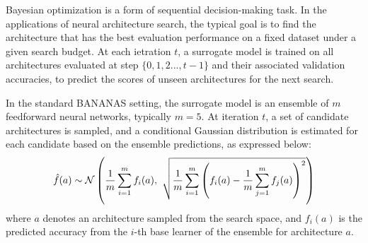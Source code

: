 {{\begin{algorithm}[htbp]
\begin{algorithmic}[1]
{\begin{enumerate}
{			\item Denote $a_{t}$ as the candidate architecture with maximum $\myfunc{\phi(a)}$; evaluate $\myfunc{f(a_{t})}$.
			\item $\mathcal{A}_{t} \leftarrow{\mathcal{A}_{t-1} \cup \{{a_{t}\}}$
		\end{enumerate}
    \ENDFOR 
    \STATE \textbf{Output:} $a^{*}=\operatorname*{argmax}_{t=1,...,T} f(a_{t})$    
  \end{algorithmic}
  \end{algorithm}

Bayesian optimization is a form of sequential decision-making task. In the applications of neural architecture search, the typical goal is to find the architecture that has the best evaluation performance on a fixed dataset under a given search budget. At each ietration $t$, a surrogate model is trained on all architectures evaluated at step $\{0, 1, 2..., t-1\}$ and their associated validation accuracies, to predict the scores of unseen architectures for the next search.

In the standard BANANAS setting, the surrogate model is an ensemble of $m$ feedforward neural networks, typically $m=5$. At iteration $t$, a set of candidate architectures is sampled, and a conditional Gaussian distribution is estimated for each candidate based on the ensemble predictions, as expressed below:
\vspace{1em}
\begin{equation}
\hat{f}(a) \sim \mathcal{N} \left( 
\frac{1}{m} \sum_{i=1}^{m} f_i(a),\ 
\sqrt{\frac{1}{m} \sum_{i=1}^{m} \left(f_i(a) - \frac{1}{m} \sum_{j=1}^{m} f_j(a) \right)^2}
\right)
\label{eq:ensemble_gaussian}
\vspace{0.7em}
\end{equation}
\noindent
where $a$ denotes an architecture sampled from the search space, and $f_i(a)$ is the predicted accuracy from the $i$-th base learner of the ensemble for architecture $a$.

}}
